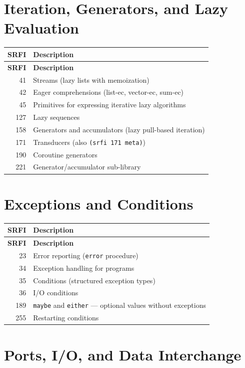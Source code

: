 \section{Iteration, Generators, and Lazy Evaluation}

\begin{longtable}{rp{9cm}}
\textbf{SRFI} & \textbf{Description} \\
\hline
\endfirsthead
\textbf{SRFI} & \textbf{Description} \\
\hline
\endhead
41 & Streams (lazy lists with memoization) \\
42 & Eager comprehensions (list-ec, vector-ec, sum-ec) \\
45 & Primitives for expressing iterative lazy algorithms \\
127 & Lazy sequences \\
158 & Generators and accumulators (lazy pull-based iteration) \\
171 & Transducers (also \texttt{(srfi 171 meta)}) \\
190 & Coroutine generators \\
221 & Generator/accumulator sub-library \\
\end{longtable}

\section{Exceptions and Conditions}

\begin{longtable}{rp{9cm}}
\textbf{SRFI} & \textbf{Description} \\
\hline
\endfirsthead
\textbf{SRFI} & \textbf{Description} \\
\hline
\endhead
23 & Error reporting (\texttt{error} procedure) \\
34 & Exception handling for programs \\
35 & Conditions (structured exception types) \\
36 & I/O conditions \\
189 & \texttt{maybe} and \texttt{either} --- optional values without exceptions \\
255 & Restarting conditions \\
\end{longtable}

\section{Ports, I/O, and Data Interchange}

